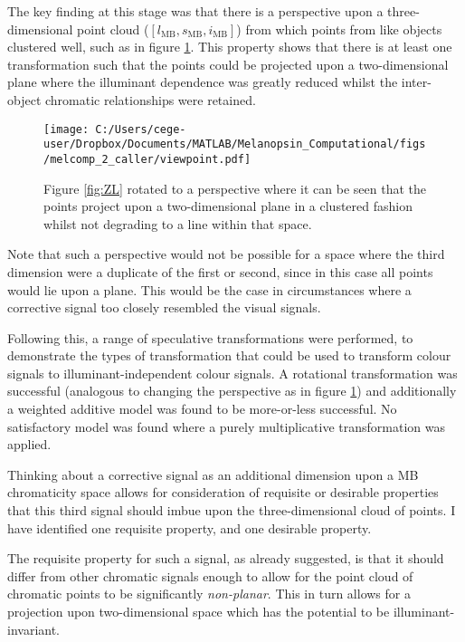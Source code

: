The key finding at this stage was that there is a perspective upon a three-dimensional point cloud ($[l_{\text{MB}},s_{\text{MB}},i_{\text{MB}}]$) from which points from like objects clustered well, such as in figure \ref{fig:viewpoint}. This property shows that there is at least one transformation such that the points could be projected upon a two-dimensional plane where the illuminant dependence was greatly reduced whilst the inter-object chromatic relationships were retained. 

\begin{figure}[h]
    \centering
    \texttt{[image: C:/Users/cege-user/Dropbox/Documents/MATLAB/Melanopsin\_Computational/figs/melcomp\_2\_caller/viewpoint.pdf]}
    \caption{Figure \ref{fig:ZL} rotated to a perspective where it can be seen that the points project upon a two-dimensional plane in a clustered fashion whilst not degrading to a line within that space.}
    \label{fig:viewpoint}
\end{figure} 

Note that such a perspective would not be possible for a space where the third dimension were a duplicate of the first or second, since in this case all points would lie upon a plane. This would be the case in circumstances where a corrective signal too closely resembled the visual signals.

Following this, a range of speculative transformations were performed, to demonstrate the types of transformation that could be used to transform colour signals to illuminant-independent colour signals. A rotational transformation was successful (analogous to changing the perspective as in figure \ref{fig:viewpoint}) and additionally a weighted additive model was found to be more-or-less successful. No satisfactory model was found where a purely multiplicative transformation was applied.

Thinking about a corrective signal as an additional dimension upon a \gls{MB} chromaticity space allows for consideration of requisite or desirable properties that this third signal should imbue upon the three-dimensional cloud of points. I have identified one requisite property, and one desirable property. 

The requisite property for such a signal, as already suggested, is that it should differ from other chromatic signals enough to allow for the point cloud of chromatic points to be significantly \emph{non-planar}. This in turn allows for a projection upon two-dimensional space which has the potential to be illuminant-invariant.

